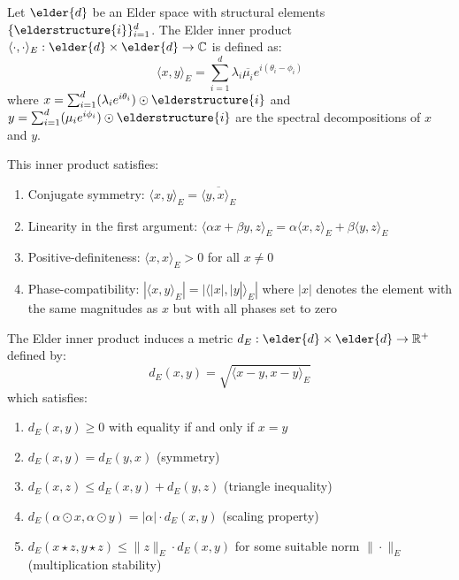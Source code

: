 \begin{definition}
Let $\elder{d}$ be an Elder space with structural elements $\{\elderstructure{i}\}_{i=1}^d$. The Elder inner product $\langle \cdot, \cdot \rangle_E: \elder{d} \times \elder{d} \rightarrow \mathbb{C}$ is defined as:
\begin{equation}
\langle x, y \rangle_E = \sum_{i=1}^d \lambda_i \overline{\mu_i} e^{i(\theta_i - \phi_i)}
\end{equation}
where $x = \sum_{i=1}^{d} (\lambda_i e^{i\theta_i}) \odot \elderstructure{i}$ and $y = \sum_{i=1}^{d} (\mu_i e^{i\phi_i}) \odot \elderstructure{i}$ are the spectral decompositions of $x$ and $y$.

This inner product satisfies:
\begin{enumerate}
    \item Conjugate symmetry: $\langle x, y \rangle_E = \overline{\langle y, x \rangle_E}$
    \item Linearity in the first argument: $\langle \alpha x + \beta y, z \rangle_E = \alpha \langle x, z \rangle_E + \beta \langle y, z \rangle_E$
    \item Positive-definiteness: $\langle x, x \rangle_E > 0$ for all $x \neq 0$
    \item Phase-compatibility: $|\langle x, y \rangle_E| = |\langle |x|, |y| \rangle_E|$ where $|x|$ denotes the element with the same magnitudes as $x$ but with all phases set to zero
\end{enumerate}
\end{definition}

\begin{theorem}
The Elder inner product induces a metric $d_E: \elder{d} \times \elder{d} \rightarrow \mathbb{R}^+$ defined by:
\begin{equation}
d_E(x, y) = \sqrt{\langle x - y, x - y \rangle_E}
\end{equation}
which satisfies:
\begin{enumerate}
    \item $d_E(x, y) \geq 0$ with equality if and only if $x = y$
    \item $d_E(x, y) = d_E(y, x)$ (symmetry)
    \item $d_E(x, z) \leq d_E(x, y) + d_E(y, z)$ (triangle inequality)
    \item $d_E(\alpha \odot x, \alpha \odot y) = |\alpha| \cdot d_E(x, y)$ (scaling property)
    \item $d_E(x \star z, y \star z) \leq \|z\|_E \cdot d_E(x, y)$ for some suitable norm $\|\cdot\|_E$ (multiplication stability)
\end{enumerate}
\end{theorem}


